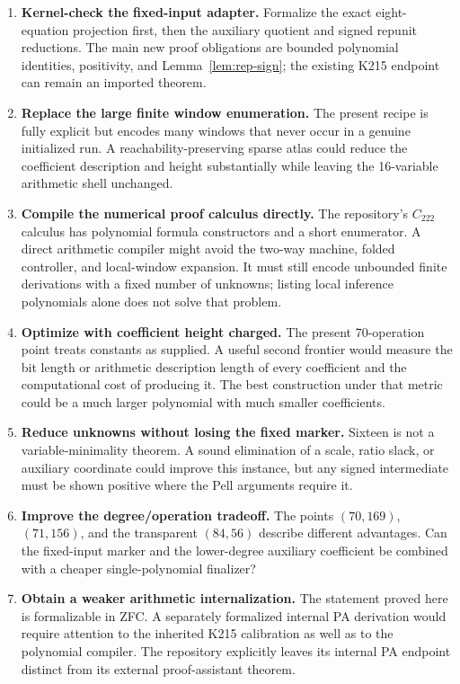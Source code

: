 \documentclass[11pt]{article}
\theoremstyle{definition}
\begin{document}
\begin{enumerate}
\item \textbf{Kernel-check the fixed-input adapter.} Formalize the exact
eight-equation projection first, then the auxiliary quotient and signed
repunit reductions. The main new proof obligations are bounded polynomial
identities, positivity, and Lemma~\ref{lem:rep-sign}; the existing K215
endpoint can remain an imported theorem.
\item \textbf{Replace the large finite window enumeration.} The present
recipe is fully explicit but encodes many windows that never occur in a
genuine initialized run. A reachability-preserving sparse atlas could reduce
the coefficient description and height substantially while leaving the
16-variable arithmetic shell unchanged.
\item \textbf{Compile the numerical proof calculus directly.} The repository's
$C_{222}$ calculus has polynomial formula constructors and a short
enumerator. A direct arithmetic compiler might avoid the two-way machine,
folded controller, and local-window expansion. It must still encode
unbounded finite derivations with a fixed number of unknowns; listing
local inference polynomials alone does not solve that problem.
\item \textbf{Optimize with coefficient height charged.} The present
70-operation point treats constants as supplied. A useful second frontier
would measure the bit length or arithmetic description length of every
coefficient and the computational cost of producing it. The best construction
under that metric could be a much larger polynomial with much smaller
coefficients.
\item \textbf{Reduce unknowns without losing the fixed marker.} Sixteen is
not a variable-minimality theorem. A sound elimination of a scale, ratio
slack, or auxiliary coordinate could improve this instance, but any signed
intermediate must be shown positive where the Pell arguments require it.
\item \textbf{Improve the degree/operation tradeoff.} The points
$(70,169)$, $(71,156)$, and the transparent $(84,56)$ describe different
advantages. Can the fixed-input marker and the lower-degree auxiliary
coefficient be combined with a cheaper single-polynomial finalizer?
\item \textbf{Obtain a weaker arithmetic internalization.} The statement
proved here is formalizable in ZFC. A separately formalized internal PA
derivation would require attention to the inherited K215 calibration as
well as to the polynomial compiler. The repository explicitly leaves its
internal PA endpoint distinct from its external proof-assistant theorem.
\end{enumerate}
\end{document}

